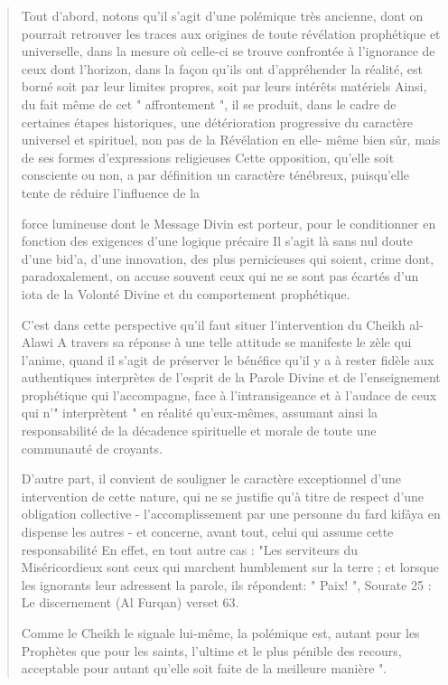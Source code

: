 \begin{quote}
Tout d'abord, notons qu'il s'agit d'une polémique très ancienne, dont on
pourrait retrouver les traces aux origines de toute révélation
prophétique et universelle, dans la mesure où celle-ci se trouve
confrontée à l'ignorance de ceux dont l'horizon, dans la façon qu'ils
ont d'appréhender la réalité, est borné soit par leur limites propres,
soit par leurs intérêts matériels Ainsi, du fait même de cet "
affrontement ", il se produit, dans le cadre de certaines étapes
historiques, une détérioration progressive du caractère universel et
spirituel, non pas de la Révélation en elle- même bien sûr, mais de ses
formes d'expressions religieuses Cette opposition, qu'elle soit
consciente ou non, a par définition un caractère ténébreux, puisqu'elle
tente de réduire l'influence de la

force lumineuse dont le Message Divin est porteur, pour le conditionner
en fonction des exigences d'une logique précaire Il s'agit là sans nul
doute d'une bid'a, d'une innovation, des plus pernicieuses qui soient,
crime dont, paradoxalement, on accuse souvent ceux qui ne se sont pas
écartés d'un iota de la Volonté Divine et du comportement prophétique.

C'est dans cette perspective qu'il faut situer l'intervention du Cheikh
al-Alawi A travers sa réponse à une telle attitude se manifeste le zèle
qui l'anime, quand il s'agit de préserver le bénéfice qu'il y a à rester
fidèle aux authentiques interprètes de l'esprit de la Parole Divine et
de l'enseignement prophétique qui l'accompagne, face à l'intransigeance
et à l'audace de ceux qui n'" interprètent " en réalité qu'eux-mêmes,
assumant ainsi la responsabilité de la décadence spirituelle et morale
de toute une communauté de croyants.

D'autre part, il convient de souligner le caractère exceptionnel d'une
intervention de cette nature, qui ne se justifie qu'à titre de respect
d'une obligation collective - l'accomplissement par une personne du fard
kifâya en dispense les autres - et concerne, avant tout, celui qui
assume cette responsabilité En effet, en tout autre cas : "Les
serviteurs du Miséricordieux sont ceux qui marchent humblement sur la
terre ; et lorsque les ignorants leur adressent la parole, ils
répondent: " Paix! ", Sourate 25 : Le discernement (Al Furqan) verset
63.

Comme le Cheikh le signale lui-même, la polémique est, autant pour les
Prophètes que pour les saints, l'ultime et le plus pénible des recours,
acceptable pour autant qu'elle soit faite de la meilleure manière ".


\end{quote}
